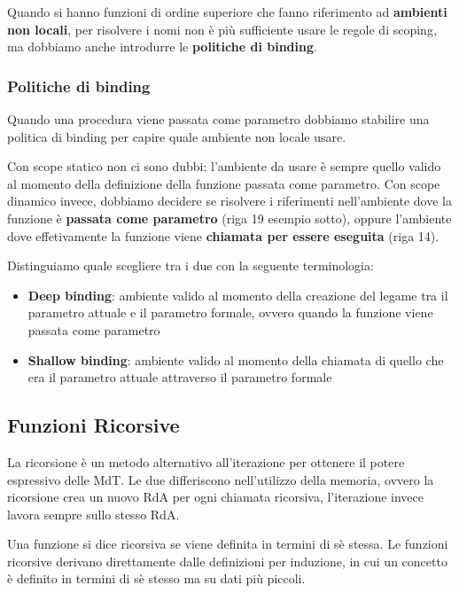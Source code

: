 \documentclass[12pt,a4paper]{article}
\begin{document}
Quando si hanno funzioni di ordine superiore che fanno riferimento ad \textbf{ambienti non locali}, per risolvere i nomi non è più sufficiente usare le regole di scoping, ma dobbiamo anche introdurre le \textbf{politiche di binding}.

\subsubsection{Politiche di binding} \label{politicheBinding}
Quando una procedura viene passata come parametro dobbiamo stabilire una politica di binding per capire quale ambiente non locale usare.

Con scope statico non ci sono dubbi: l'ambiente da usare è sempre quello valido al momento della definizione della funzione passata come parametro.
Con scope dinamico invece, dobbiamo decidere se risolvere i riferimenti nell'ambiente dove la funzione è \textbf{passata come parametro} (riga 19 esempio sotto), oppure l'ambiente dove effetivamente la funzione viene \textbf{chiamata per essere eseguita} (riga 14).

Distinguiamo quale scegliere tra i due con la seguente terminologia:
\begin{itemize}
\item \textbf{Deep binding}: ambiente valido al momento della creazione del legame tra il parametro attuale e il parametro formale, ovvero quando la funzione viene passata come parametro
\item \textbf{Shallow binding}: ambiente valido al momento della chiamata di quello che era il parametro attuale attraverso il parametro formale
\end{itemize}



\clearpage

\subsection{Funzioni Ricorsive}
La ricorsione è un metodo alternativo all'iterazione per ottenere il potere espressivo delle MdT. Le due differiscono nell'utilizzo della memoria, ovvero la ricorsione crea un nuovo RdA per ogni chiamata ricorsiva, l'iterazione invece lavora sempre sullo stesso RdA.


Una funzione si dice ricorsiva se viene definita in termini di sè stessa. Le funzioni ricorsive derivano direttamente dalle definizioni per induzione, in cui un concetto è definito in termini di sè stesso ma su dati più piccoli.
\end{document}
